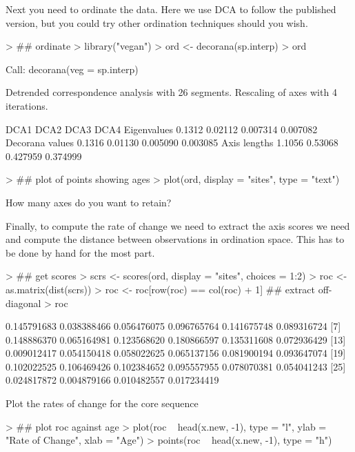 \documentclass[a4paper,10pt]{article}
\begin{document}
Next you need to ordinate the data. Here we use DCA to follow the published version, but you could try other ordination techniques should you wish.
\begin{Schunk}
\begin{Sinput}
> ## ordinate
> library("vegan")
> ord <- decorana(sp.interp)
> ord
\end{Sinput}
\begin{Soutput}
Call:
decorana(veg = sp.interp) 

Detrended correspondence analysis with 26 segments.
Rescaling of axes with 4 iterations.

                  DCA1    DCA2     DCA3     DCA4
Eigenvalues     0.1312 0.02112 0.007314 0.007082
Decorana values 0.1316 0.01130 0.005090 0.003085
Axis lengths    1.1056 0.53068 0.427959 0.374999
\end{Soutput}
\begin{Sinput}
> ## plot of points showing ages
> plot(ord, display = "sites", type = "text")
\end{Sinput}
\end{Schunk}

How many axes do you want to retain?

Finally, to compute the rate of change we need to extract the axis scores we
need and compute the distance between observations in ordination space. This
has to be done by hand for the most part.
\begin{Schunk}
\begin{Sinput}
> ## get scores
> scrs <- scores(ord, display = "sites", choices = 1:2)
> roc <- as.matrix(dist(scrs))
> roc <- roc[row(roc) == col(roc) + 1] ## extract off-diagonal
> roc
\end{Sinput}
\begin{Soutput}
 [1] 0.145791683 0.038388466 0.056476075 0.096765764 0.141675748 0.089316724
 [7] 0.148886370 0.065164981 0.123568620 0.180866597 0.135311608 0.072936429
[13] 0.009012417 0.054150418 0.058022625 0.065137156 0.081900194 0.093647074
[19] 0.102022525 0.106469426 0.102384652 0.095557955 0.078070381 0.054041243
[25] 0.024817872 0.004879166 0.010482557 0.017234419
\end{Soutput}
\end{Schunk}

Plot the rates of change for the core sequence
\begin{Schunk}
\begin{Sinput}
> ## plot roc against age
> plot(roc ~ head(x.new, -1), type = "l", ylab = "Rate of Change", xlab = "Age")
> points(roc ~ head(x.new, -1), type = "h")
\end{Sinput}
\end{Schunk}
\end{document}
